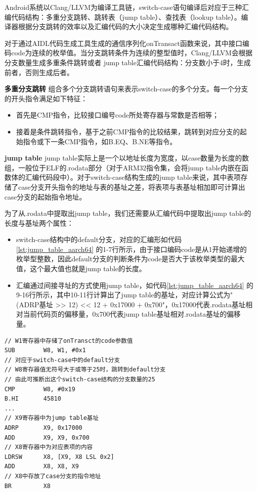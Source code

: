 \documentclass[winfonts,master,twoside]{njuthesis}
\begin{document}
Android系统以Clang/LLVM为编译工具链，switch-case语句编译后对应于三种汇编代码结构：多重分支跳转、跳转表（jump table）、查找表（lookup table）。编译器根据分支跳转的效率以及汇编代码的大小决定生成哪种汇编代码结构。

对于通过AIDL代码生成工具生成的通信序列化onTransact函数来说，其中接口编码code为连续的枚举值。当分支跳转条件为连续的整型值时，Clang/LLVM会根据分支数量生成多重条件跳转或者
jump table汇编代码结构：分支数小于4时，生成前者，否则生成后者。

\textbf{多重分支跳转} \quad 组合多个分支跳转语句来表示switch-case的多个分支。每一个分支的开头指令满足如下特征：
\begin{itemize}
	\item 首先是CMP指令，比较接口编号code所处寄存器与常数是否相等；
    \item 接着是条件跳转指令，基于之前CMP指令的比较结果，跳转到对应分支的起始指令或下一条CMP指令，如B.EQ、B.NE等指令。
\end{itemize}

\textbf{jump table} \quad jump table实际上是一个以地址长度为宽度，以case数量为长度的数组，一般位于ELF的.rodata部分（对于ARM32指令集，会将jump table内嵌在函数体的汇编代码段中）。对于switch-case结构生成的jump table来说，其中表项存储了case分支开头指令的地址与表的基址之差，将表项与表基址相加即可计算出case分支的起始指令地址。

为了从.rodata中提取出jump table，我们还需要从汇编代码中提取出jump table的长度与基址两个属性：
\begin{itemize}
	\item switch-case结构中的default分支，对应的汇编形如代码\ref{lst:jump_table_aarch64} 的1-7行所示，由于接口编码code是从1开始递增的枚举型整数，因此default分支的判断条件为code是否大于该枚举类型的最大值，这个最大值也就是jump table的长度。
	\item 汇编通过间接寻址的方式使用jump table，如代码\ref{lst:jump_table_aarch64} 的9-16行所示，其中10-11行计算出了jump table的基址，对应计算公式为"(ADRP基址 >> 12) << 12 + 0x17000 + 0x700"，0x17000代表.rodata基址相对当前代码页的偏移量，0x700代表jump table基址相对.rodata基址的偏移量。
\end{itemize}

\begin{lstlisting}[caption={AArch64汇编中对于jump table的使用},label={lst:jump_table_aarch64}] 
// W1寄存器中存储了onTransct的code参数值
SUB        W8, W1, #0x1
// 对应于switch-case中的default分支
// W8寄存器值无符号大于或等于25时，跳转到default分支
// 由此可推断出这个switch-case结构的分支数量的25
CMP        W8, #0x19
B.HI       45810
...
// X9寄存器中为jump table基址
ADRP       X9, 0x17000
ADD        X9, X9, 0x700
// X8寄存器中为对应表项的内容
LDRSW      X8, [X9, X8 LSL 0x2]
ADD        X8, X8, X9
// X8中存放了case分支的指令地址
BR         X8
\end{lstlisting}
\end{document}
